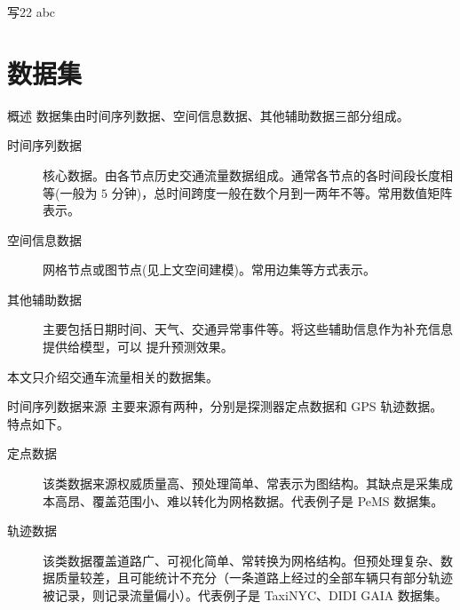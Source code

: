 \documentclass{libs/format}
\begin{document}
\begin{frame}{写22}
  abc
\end{frame}

\section{数据集}

\begin{frame}{概述}
  数据集由时间序列数据、空间信息数据、其他辅助数据三部分组成。
  \begin{description}
    \item[时间序列数据] 核心数据。由各节点历史交通流量数据组成。通常各节点的各时间段长度相等(一般为 $5$ 分钟)，总时间跨度一般在数个月到一两年不等。常用数值矩阵表示。
    \item[空间信息数据] 网格节点或图节点(见上文空间建模)。常用边集等方式表示。
    \item[其他辅助数据] 主要包括日期时间、天气、交通异常事件等。将这些辅助信息作为补充信息提供给模型，可以
    提升预测效果。
  \end{description}
  本文只介绍交通车流量相关的数据集。
\end{frame}

\begin{frame}{时间序列数据来源}
  主要来源有两种，分别是探测器定点数据和 GPS 轨迹数据。特点如下。
  \begin{description}
    \item[定点数据] 该类数据来源权威质量高、预处理简单、常表示为图结构。其缺点是采集成本高昂、覆盖范围小、难以转化为网格数据。代表例子是 PeMS 数据集。
    \item[轨迹数据] 该类数据覆盖道路广、可视化简单、常转换为网格结构。但预处理复杂、数据质量较差，且可能统计不充分（一条道路上经过的全部车辆只有部分轨迹被记录，则记录流量偏小）。代表例子是 TaxiNYC、DIDI GAIA 数据集。
  \end{description}
\end{frame}
\end{document}
